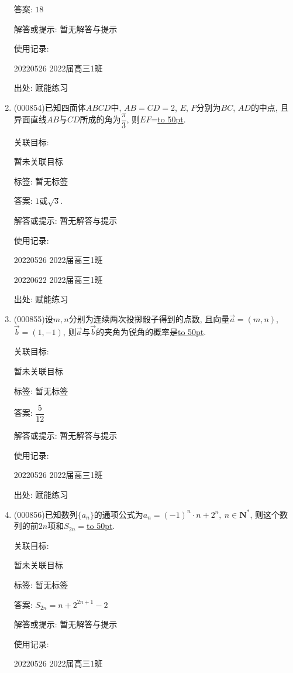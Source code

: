 \documentclass[10pt,a4paper]{article}
\newcommand{\blank}[1]{\underline{\hbox to #1pt{}}}
\begin{document}
\begin{enumerate}[1.]
答案: $18$

解答或提示: 暂无解答与提示

使用记录:

20220526	2022届高三1班	


出处: 赋能练习
\item { (000854)}已知四面体$ABCD$中, $AB=CD=2$, $E$, $F$分别为$BC$, $AD$的中点, 且异面直线$AB$与$CD$所成的角为$\dfrac{\pi}3$, 则$EF$=\blank{50}.


关联目标:

暂未关联目标



标签: 暂无标签

答案: $1$或$\sqrt 3$.

解答或提示: 暂无解答与提示

使用记录:

20220526	2022届高三1班	

20220622	2022届高三1班  	


出处: 赋能练习
\item { (000855)}设$m,n$分别为连续两次投掷骰子得到的点数, 且向量$\overrightarrow a=(m,n)$,$\overrightarrow b=(1,-1)$, 则$\overrightarrow a$与$\overrightarrow b$的夹角为锐角的概率是\blank{50}.


关联目标:

暂未关联目标



标签: 暂无标签

答案: $\dfrac 5{12}$

解答或提示: 暂无解答与提示

使用记录:

20220526	2022届高三1班	


出处: 赋能练习
\item { (000856)}已知数列$\{a_n\}$的通项公式为$a_n={(-1)}^n\cdot n+2^n, \ n\in \mathbf{N}^*$, 则这个数列的前$2n$项和$S_{2n}=$\blank{50}.


关联目标:

暂未关联目标



标签: 暂无标签

答案: $S_{2n}=n+2^{2n+1}-2$

解答或提示: 暂无解答与提示

使用记录:

20220526	2022届高三1班	



\end{enumerate}
\end{document}
